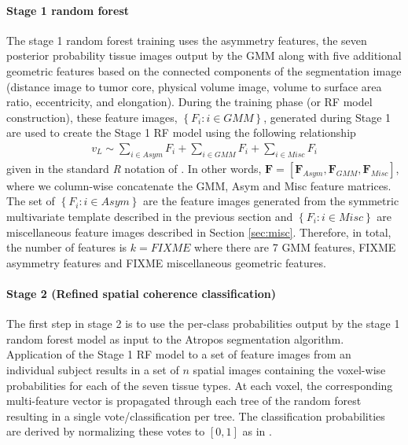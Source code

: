 \documentclass[preprint,authoryear,review,12pt]{elsarticle}
\begin{document}
\paragraph{Stage 1 random forest} 
The stage 1 random forest training uses the asymmetry features, the seven posterior probability
tissue images output by the GMM
along with five additional geometric features based on the connected 
components of the segmentation image (distance image to tumor core,
physical volume image, volume to surface area ratio, eccentricity,
and elongation).
During the training phase (or RF model construction),
these feature images, $\left\{F_i: i \in GMM\right\}$, generated during Stage 1 are used to create
the Stage 1 RF model using the following relationship
\begin{align}
\label{eq:gmm}
 v_L \sim \sum_{i \in Asym} F_i + \sum_{i \in GMM} F_i + \sum_{i \in Misc} F_i
\end{align}
given in the standard \textit{R} notation of \cite{wilkinson1973}.  
In other words, $\bm{F}= [ \bm{F}_{Asym}, \bm{F}_{GMM},
\bm{F}_{Misc} ]$, where we column-wise concatenate the GMM, Asym and
Misc feature matrices.
The set of $\left\{F_i: i \in Asym\right\}$ are the feature images 
generated from the symmetric multivariate template 
described in the previous section and $\left\{F_i: i \in Misc\right\}$
are miscellaneous feature images described in Section \ref{sec:misc}.
Therefore, in total, the number of features is $k=FIXME$ where there
are 7 GMM features, FIXME asymmetry features and FIXME miscellaneous
geometric features.

\paragraph{Stage 2 (Refined spatial coherence classification)}
The first step in stage 2 is to use the per-class probabilities output
by the stage 1 random forest model as input to the Atropos
segmentation algorithm.  Application of the Stage 1 RF model to a set of feature images 
from an individual subject results in a set of $n$ spatial images
containing the voxel-wise probabilities for each 
of the seven tissue types.  At each voxel, the corresponding multi-feature 
vector is propagated through each tree of the random forest 
resulting in a single vote/classification per tree.  The
classification probabilities are derived by normalizing 
these votes to $[0,1]$ as in \cite{liaw2002}.
 
\end{document}
